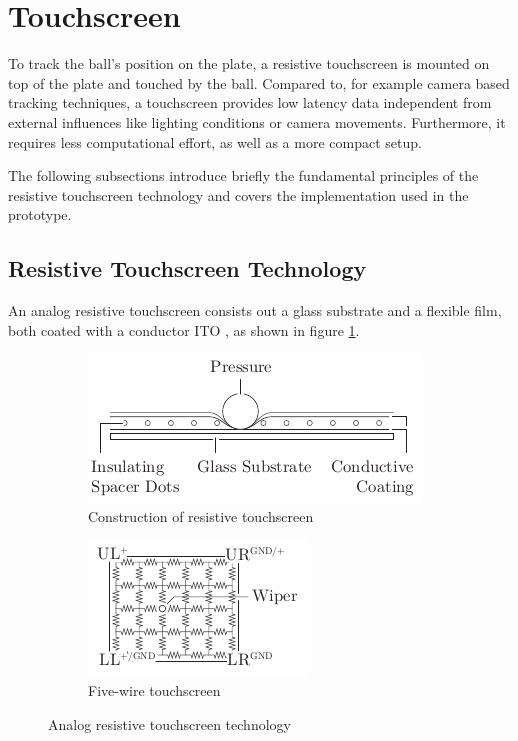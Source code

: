 \section{Touchscreen}
To track the ball's position on the plate, a resistive touchscreen is mounted
on top of the plate and touched by the ball. Compared to, for example camera
based tracking techniques, a touchscreen provides low latency data independent
from external influences like lighting conditions or camera movements.
Furthermore, it requires less computational effort, as well as a more compact
setup.

The following subsections introduce briefly the fundamental principles of the
resistive touchscreen technology and covers the implementation used in the
prototype.

\subsection{Resistive Touchscreen Technology}
An analog resistive touchscreen consists out a glass substrate and a flexible
film, both coated with a conductor \ac{ITO} \citep{Wal12}, as shown in figure
\ref{fig:touch_build}.
\begin{figure}
	\centering
	\begin{subfigure}{0.49\textwidth}
		\centering
		\includegraphics[width=\textwidth]{../figures/touch_build}
		\caption{Construction of resistive touchscreen}
		\label{fig:touch_build}
	\end{subfigure}
	\begin{subfigure}{0.49\textwidth}
		\centering
		\includegraphics[width=\textwidth]{../figures/touch_five}
		\caption{Five-wire touchscreen}
		\label{fig:touch_five}
	\end{subfigure}
	\caption{Analog resistive touchscreen technology}
	\label{fig:touch}
\end{figure}
